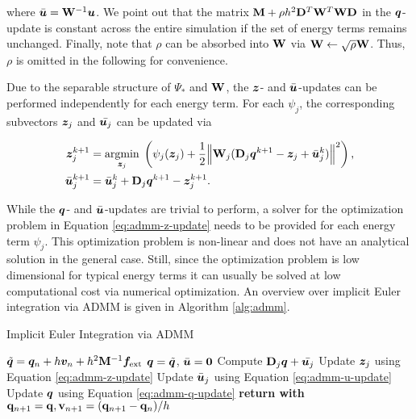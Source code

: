 \noindent where $\bar{\bm{u}} = \mathbf{W}^{-1}\bm{u}$. We point out that the matrix $\mathbf{M} + \rho h^2 \mathbf{D}^T\mathbf{W}^T\mathbf{W}\mathbf{D}$ in the $\bm{q}$-update 
is constant across the entire simulation if the set of energy terms remains unchanged. Finally, note that $\rho$ can be absorbed into $\mathbf{W}$ via $\mathbf{W} \leftarrow 
\sqrt{\rho}\mathbf{W}$. Thus, $\rho$ is omitted in the following for convenience. 

Due to the separable structure of $\Psi_*$ and $\mathbf{W}$, the $\bm{z}$- and $\bar{\bm{u}}$-updates can be performed independently for each energy term. For each 
$\psi_j$, the corresponding subvectors $\bm{z}_j$ and $\bar{\bm{u}_j}$ can be updated via

\begin{align}
    \bm{z}^{k+1}_j &= \underset{\bm{z}_j}{\operatorname{argmin}}\; \left( \psi_j(\bm{z}_j) + \frac{1}{2}\norm{\mathbf{W}_j(\mathbf{D}_j\bm{q}^{k+1} - \bm{z}_j + \bar{\bm{u}}^k_j)}^2 \right), 
    \label{eq:admm-z-update} \\
    \bar{\bm{u}}^{k+1}_j &= \bar{\bm{u}}^k_j + \mathbf{D}_j{\bm{q}}^{k+1} - \bm{z}^{k+1}_j. \label{eq:admm-u-update}
\end{align}

\noindent While the $\bm{q}$- and $\bar{\bm{u}}$-updates are trivial to perform, a solver for the optimization problem in Equation \ref{eq:admm-z-update} needs to be 
provided for each energy term $\psi_j$. This optimization problem is non-linear and does not have an analytical solution in the general case. Still, since the optimization 
problem is low dimensional for typical energy terms it can usually be solved at low computational cost via numerical optimization. An overview over implicit Euler 
integration via ADMM is given in Algorithm \ref{alg:admm}.

\begin{algorithm}
\caption{Implicit Euler Integration via ADMM}\label{alg:admm}
\begin{algorithmic}
\State $\tilde{\bm{q}} = \bm{q}_n + h\bm{v}_n + h^2\mathbf{M}^{-1}\bm{f}_{\text{ext}}$
\State $\bm{q} = \tilde{\bm{q}}$, $\bar{\bm{u}} = \bm{0}$
\State Compute $\mathbf{D}_j\bm{q} + \bar{\bm{u}_j}$
\State Update $\bm{z}_j$ using Equation \ref{eq:admm-z-update}
\State Update $\bar{\bm{u}}_j$ using Equation \ref{eq:admm-u-update}
\EndFor
\State Update $\bm{q}$ using Equation \ref{eq:admm-q-update}
\EndFor
\State \textbf{return with } $\mathbf{q}_{n+1} = \mathbf{q}, \mathbf{v}_{n+1} = (\mathbf{q}_{n+1} - \mathbf{q}_n) / h$
\EndProcedure
\end{algorithmic}
\end{algorithm}


